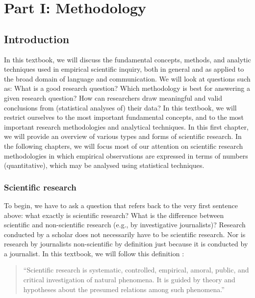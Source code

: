 \documentclass[
]{book}
\begin{document}
\hypertarget{part-part-i-methodology}{%
\part*{Part I: Methodology}\label{part-part-i-methodology}}

\hypertarget{ch:introduction}{%
\chapter{Introduction}\label{ch:introduction}}

In this textbook, we will discuss the fundamental concepts, methods, and analytic techniques used in empirical scientific inquiry, both in general and as applied to the broad domain of language and communication. We will look at questions such as: What is a good research question? Which methodology is best for answering a given research question? How can researchers draw meaningful and valid conclusions from (statistical analyses of) their data? In this textbook, we will restrict ourselves to the most important fundamental concepts, and to the most important research methodologies and analytical techniques. In this first chapter, we will provide an overview of various types and forms of scientific research. In the following chapters, we will focus most of our attention on scientific research methodologies in which empirical observations are expressed in terms of numbers (quantitative), which may be analysed using statistical techniques.

\hypertarget{sec:scientific-research}{%
\section{Scientific research}\label{sec:scientific-research}}

To begin, we have to ask a question that refers back to the very first sentence above: what exactly is scientific research? What is the difference between scientific and non-scientific research (e.g., by investigative journalists)? Research conducted by a scholar does not necessarily have to be scientific research. Nor is research by journalists non-scientific by definition just because it is conducted by a journalist. In this textbook, we will follow this definition \citep[p.14]{KL00}:

\begin{quote}
``Scientific
research is systematic, controlled, empirical, amoral, public, and
critical investigation of natural phenomena. It is guided by theory and hypotheses about the presumed relations among such phenomena.''
\end{quote}
\end{document}
